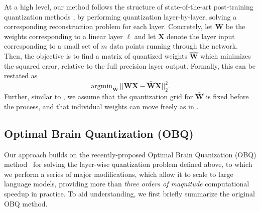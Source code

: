 At a high level, our method follows the structure of state-of-the-art post-training quantization methods \cite{nagel2020up, wang2020towards, hubara2021accurate, frantar2022obc}, by performing quantization  layer-by-layer, solving a corresponding reconstruction problem for each layer.
Concretely, let $\mathbf{W}$ be the weights corresponding to a linear layer $\ell$ and let $\mathbf{X}$ denote the layer input corresponding to a small set of $m$ data points running through the network. 
Then, the objective is to find a matrix of quantized weights $\mathbf{\widehat{W}}$ which minimizes the squared error, relative to the full precision layer output. Formally, this can be restated as 
\begin{equation}
    \label{eq:layerwise-quantization}
    \text{argmin}_{\mathbf{\widehat{W}}} \, ||\mathbf{W} \mathbf{X} - \mathbf{\widehat{W}} \mathbf{X}||_2^2.
\end{equation}
Further, similar to \cite{nagel2020up, li2021brecq, frantar2022obc}, we assume that the quantization grid for $\mathbf{\widehat{W}}$ is fixed before the process, 
and that individual weights can move freely as in \cite{hubara2021accurate, frantar2022obc}.

\subsection{Optimal Brain Quantization (OBQ)}

Our approach builds on the recently-proposed Optimal Brain Quanization (OBQ) method~\cite{frantar2022obc} for solving the layer-wise quantization problem defined above, 
to which we perform a series of major modifications, which allow it to scale to large language models, providing more than \emph{three orders of magnitude} computational speedup in practice.
To aid understanding, we first briefly summarize the original OBQ method.

